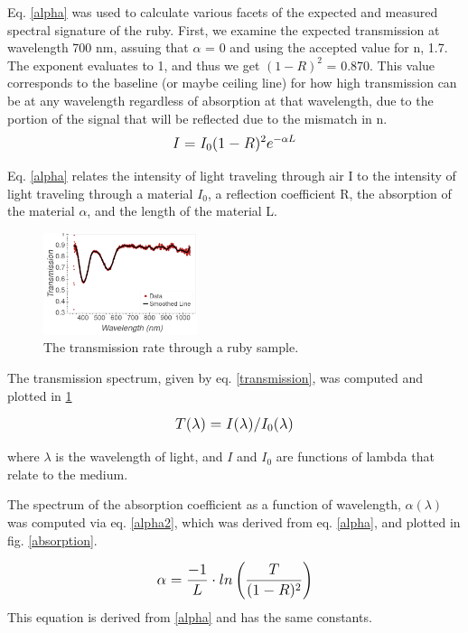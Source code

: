 \documentclass[aps,prl,reprint]{revtex4-2}
\begin{document}
Eq. \ref{alpha} was used to calculate various facets of the expected and measured
spectral signature of the ruby. First, we examine the expected transmission at
wavelength 700 nm, assuing that $\alpha$ = 0 and using the accepted value for n, 1.7.
The exponent evaluates to 1, and thus we get $(1-R)^2$ = 0.870. This value 
corresponds to the baseline (or maybe ceiling line) for how high transmission can
be at any wavelength regardless of absorption at that wavelength, due to the portion
of the signal that will be reflected due to the mismatch in n. \\

\begin{equation}
	\mathlarger{I = I_0(1-R)^2e^{-\alpha L}}
    \label{alpha}
\end{equation}

Eq. \ref{alpha} relates the intensity of light traveling through air I to the intensity
of light traveling through a material $I_0$, a reflection coefficient R, the absorption
of the material $\alpha$, and the length of the material L.

\begin{figure}[h]
	\includegraphics[width=0.4\textwidth]{../Images/l3_B_b.png}
	\caption{\label{transmission_plot} The transmission rate through a ruby sample.}
\end{figure}


The transmission spectrum, given by eq. \ref{transmission}, was computed and plotted in
\ref{transmission_plot}

\begin{equation}
	\mathlarger{T(\lambda) = I(\lambda)/I_0(\lambda)}
    \label{transmission}
\end{equation}

where $\lambda$ is the wavelength of light, and $I$ and $I_0$ are functions of
lambda that relate to the medium.

The spectrum of the absorption coefficient as a function of wavelength, 
$\alpha(\lambda)$ was computed via eq. \ref{alpha2}, which was derived from eq. 
\ref{alpha}, and plotted in fig. \ref{absorption}.

\begin{equation}
	\mathlarger{\alpha = \frac{-1}{L} \cdot ln\left(\frac{T}{(1-R)^2}\right)}
	\label{alpha2}
\end{equation}
This equation is derived from \ref{alpha} and has the same constants.
\end{document}
